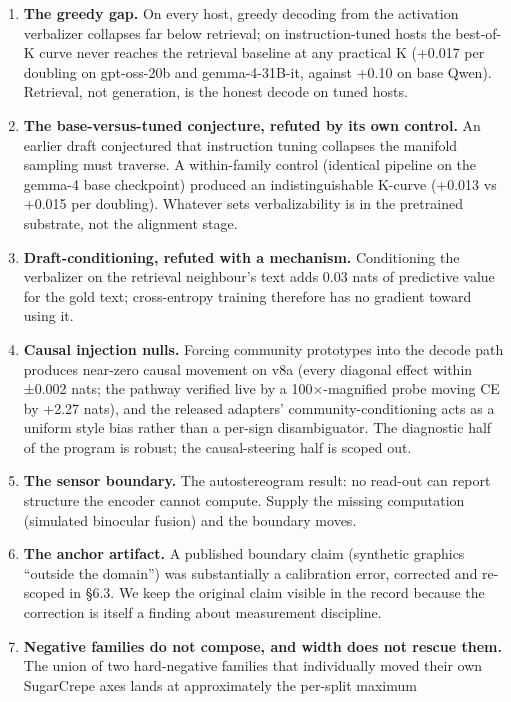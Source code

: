 \documentclass[
  11pt,
]{article}
\begin{document}
\begin{enumerate}
\def\labelenumi{\arabic{enumi}.}
\item
  \textbf{The greedy gap.} On every host, greedy decoding from the
  activation verbalizer collapses far below retrieval; on
  instruction-tuned hosts the best-of-K curve never reaches the
  retrieval baseline at any practical K (+0.017 per doubling on
  gpt-oss-20b and gemma-4-31B-it, against +0.10 on base Qwen).
  Retrieval, not generation, is the honest decode on tuned hosts.
\item
  \textbf{The base-versus-tuned conjecture, refuted by its own control.}
  An earlier draft conjectured that instruction tuning collapses the
  manifold sampling must traverse. A within-family control (identical
  pipeline on the gemma-4 base checkpoint) produced an indistinguishable
  K-curve (+0.013 vs +0.015 per doubling). Whatever sets verbalizability
  is in the pretrained substrate, not the alignment stage.
\item
  \textbf{Draft-conditioning, refuted with a mechanism.} Conditioning
  the verbalizer on the retrieval neighbour's text adds 0.03 nats of
  predictive value for the gold text; cross-entropy training therefore
  has no gradient toward using it.
\item
  \textbf{Causal injection nulls.} Forcing community prototypes into the
  decode path produces near-zero causal movement on v8a (every diagonal
  effect within ±0.002 nats; the pathway verified live by a
  100×-magnified probe moving CE by +2.27 nats), and the released
  adapters' community-conditioning acts as a uniform style bias rather
  than a per-sign disambiguator. The diagnostic half of the program is
  robust; the causal-steering half is scoped out.
\item
  \textbf{The sensor boundary.} The autostereogram result: no read-out
  can report structure the encoder cannot compute. Supply the missing
  computation (simulated binocular fusion) and the boundary moves.
\item
  \textbf{The anchor artifact.} A published boundary claim (synthetic
  graphics ``outside the domain'') was substantially a calibration
  error, corrected and re-scoped in §6.3. We keep the original claim
  visible in the record because the correction is itself a finding about
  measurement discipline.
\item
  \textbf{Negative families do not compose, and width does not rescue
  them.} The union of two hard-negative families that individually moved
  their own SugarCrepe axes lands at approximately the per-split maximum

\end{enumerate}
\end{document}
